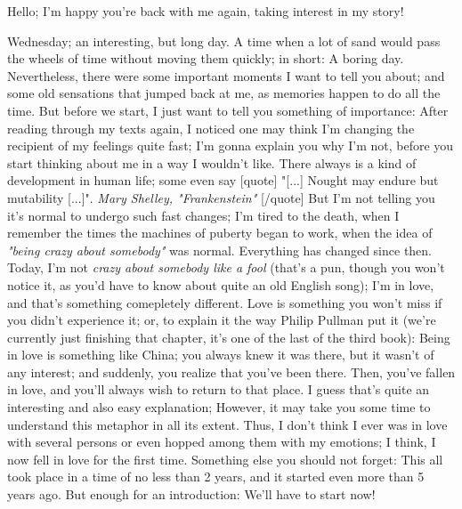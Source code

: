 Hello; I'm happy you're back with me again, taking interest in my story!

Wednesday; an interesting, but long day. A time when a lot of sand would pass the wheels of time without moving them quickly; in short: A boring day. Nevertheless, there were some important moments I want to tell you about; and some old sensations that jumped back at me, as memories happen to do all the time.
But before we start, I just want to tell you something of importance: After reading through my texts again, I noticed one may think I'm changing the recipient of my feelings quite fast; I'm gonna explain you why I'm not, before you start thinking about me in a way I wouldn't like. 
There always is a kind of development in human life; some even say 
[quote]
"[...] Nought may endure but mutability [...]". 
\emph{Mary Shelley, "Frankenstein"}
[/quote]
But I'm not telling you it's normal to undergo such fast changes; I'm tired to the death, when I remember the times the machines of puberty began to work, when the idea of \emph{"being crazy about somebody"} was normal. 
Everything has changed since then. 
Today, I'm not \emph{crazy about somebody like a fool} (that's a pun, though you won't notice it, as you'd have to know about quite an old English song); I'm in love, and that's something comepletely different. 
Love is something you won't miss if you didn't experience it; or, to explain it the way Philip Pullman put it (we're currently just finishing that chapter, it's one of the last of the third book): Being in love is something like China; you always knew it was there, but it wasn't of any interest; and suddenly, you realize that you've been there. 
Then, you've fallen in love, and you'll always wish to return to that place. 
I guess that's quite an interesting and also easy explanation; However, it may take you some time to understand this metaphor in all its extent. 
Thus, I don't think I ever was in love with several persons or even hopped among them with my emotions; I think, I now fell in love for the first time. 
Something else you should not forget: This all took place in a time of no less than 2 years, and it started even more than 5 years ago. 
But enough for an introduction: We'll have to start now! 

